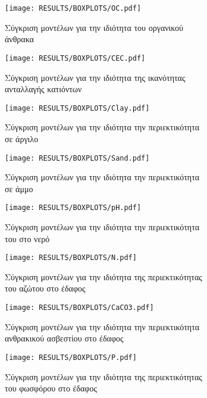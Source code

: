 \begin{figure}[H]
    \begin{subfigure}{0.5\textwidth}
        \texttt{[image: RESULTS/BOXPLOTS/OC.pdf]}
        \caption{Σύγκριση μοντέλων για την ιδιότητα του οργανικού άνθρακα}
        \label{fig:OC_boxplot}
    \end{subfigure}
    \begin{subfigure}{0.5\textwidth}
        \texttt{[image: RESULTS/BOXPLOTS/CEC.pdf]}
        \caption{Σύγκριση μοντέλων για την ιδιότητα της ικανότητας ανταλλαγής κατιόντων}
        \label{fig:CEC_boxplot}
    \end{subfigure}
    \caption{}
\end{figure}
\begin{figure}[H]
    \begin{subfigure}{0.5\textwidth}
        \texttt{[image: RESULTS/BOXPLOTS/Clay.pdf]}
        \caption{Σύγκριση μοντέλων για την ιδιότητα την περιεκτικότητα σε άργιλο}
        \label{fig:Clay_boxplot}
    \end{subfigure}
    \begin{subfigure}{0.5\textwidth}
        \texttt{[image: RESULTS/BOXPLOTS/Sand.pdf]}
        \caption{Σύγκριση μοντέλων για την ιδιότητα την περιεκτικότητα σε άμμο}
        \label{fig:Sand_boxplot}
    \end{subfigure}
    \caption{}
\end{figure}
\begin{figure}[H]
    \begin{subfigure}{0.5\textwidth}
        \texttt{[image: RESULTS/BOXPLOTS/pH.pdf]}
        \caption{Σύγκριση μοντέλων για την ιδιότητα την περιεκτικότητα του  στο νερό}
        \label{fig:pH_boxplot}
    \end{subfigure}
    \begin{subfigure}{0.5\textwidth}
        \texttt{[image: RESULTS/BOXPLOTS/N.pdf]}
        \caption{Σύγκριση μοντέλων για την ιδιότητα της περιεκτικότητας του αζώτου στο έδαφος}
        \label{fig:N_boxplot}
    \end{subfigure}
    \caption{}
\end{figure}
\begin{figure}[H]
    \begin{subfigure}{0.5\textwidth}
        \texttt{[image: RESULTS/BOXPLOTS/CaCO3.pdf]}
        \caption{Σύγκριση μοντέλων για την ιδιότητα την περιεκτικότητα ανθρακικού ασβεστίου στο έδαφος}
        \label{fig:CaCO3_boxplot}
    \end{subfigure}
    \begin{subfigure}{0.5\textwidth}
        \texttt{[image: RESULTS/BOXPLOTS/P.pdf]}
        \caption{Σύγκριση μοντέλων για την ιδιότητα της περιεκτικότητας του φωσφόρου στο έδαφος}
        \label{fig:P_boxplot}
    \end{subfigure}
    \caption{}
\end{figure}
